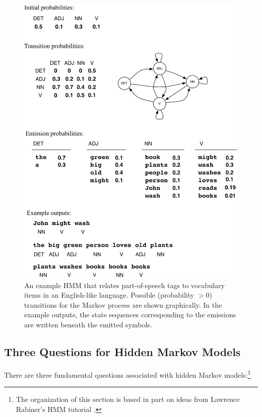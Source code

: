 \begin{figure}
\begin{center}
\vspace{0.2cm}
\includegraphics[scale=0.58]{figures/fig-ch6-english-pos-hmm.pdf}
\vspace{-0.3cm}
\end{center}\caption{An example HMM that relates part-of-speech tags to vocabulary items in an English-like language.  Possible (probability $>0$) transitions for the Markov process are shown graphically. In the example outputs, the state sequences corresponding to the emissions are written beneath the emitted symbols.}\label{chapter6_hmm_example}
\end{figure}

\subsection{Three Questions for Hidden Markov Models}

There are three fundamental questions associated with hidden Markov
models:\footnote{The organization of this section is based in part on
  ideas from Lawrence Rabiner's HMM tutorial \cite{Rabiner_1990}.}

